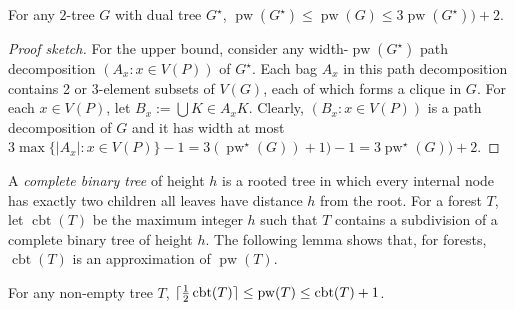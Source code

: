 \documentclass[kpfonts]{patmorin}
\DeclareMathOperator{\pw}{pw}
\DeclareMathOperator{\sh}{cbt}
\DeclareMathOperator{\cbt}{cbt}
\begin{document}
\begin{lem}\label{dual_approx}
    For any $2$-tree $G$ with dual tree $G^\star$, $\pw(G^\star) \le \pw(G) \le 3\pw(G^\star)) + 2$.
\end{lem}

\begin{proof}[Proof sketch]
    For the upper bound, consider any width-$\pw(G^\star)$ path decomposition $(A_x:x\in V(P))$ of $G^\star$. Each bag $A_x$ in this path decomposition contains 2 or 3-element subsets of $V(G)$, each of which forms a clique in $G$.  For each $x\in V(P)$, let $B_x:=\bigcup{K\in A_x}K$.  Clearly, $(B_x:x\in V(P))$ is a path decomposition of $G$ and it has width at most $3\max\{|A_x|:x\in V(P)\}-1=3(\pw^\star(G))+1)-1=3\pw^\star(G)) + 2$.

\end{proof}

A \emph{complete binary tree} of height $h$ is a rooted tree in which every internal node has exactly two children all leaves have distance $h$ from the root.  For a forest $T$, let $\cbt(T)$ be the maximum integer $h$ such that $T$ contains a subdivision of a complete binary tree of height $h$.  The following lemma shows that, for forests, $\sh(T)$ is an approximation of $\pw(T)$.

\begin{lem}\label{b_approx}
    For any non-empty tree $T$, $\ceil{\tfrac{1}{2}\sh(T)} \le \pw(T) \le \sh(T)+1$.
\end{lem}
\end{document}
